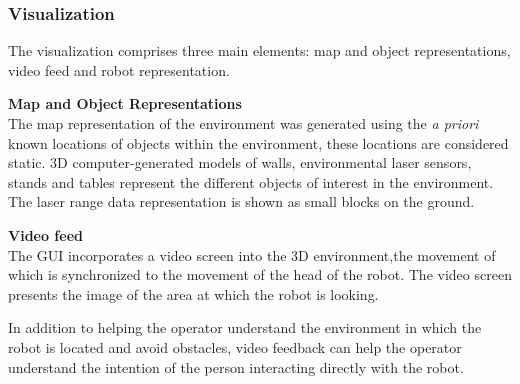 \documentclass[a4paper, 10pt, conference]{ieeeconf}     %
\begin{document}

\subsubsection{Visualization}
The visualization comprises three main elements: map and object representations, video feed and robot representation.

{\bf Map and Object Representations}\\
The map representation of the environment was generated using the \emph{a priori} known locations of objects within the environment, these locations are considered static. 
3D computer-generated models of walls, environmental laser sensors, stands and tables represent the different objects of interest in the environment. 
The laser range data representation is shown as small blocks on the ground.

{\bf Video feed}\\
The GUI incorporates a video screen into the 3D environment,the movement of which is synchronized to the movement of the head of the robot. 
The video screen presents the image of the area at which the robot is looking.

In addition to helping the operator understand the environment in which the robot is located and avoid obstacles, video feedback can help the operator understand the intention of the person interacting directly with the robot.
\end{document}
